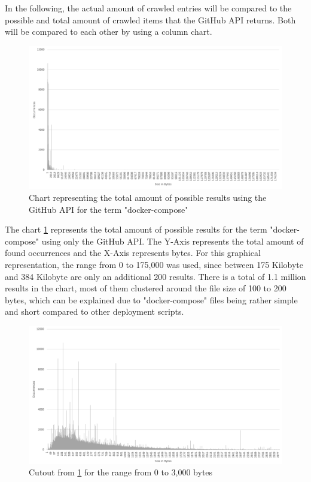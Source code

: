 In the following, the actual amount of crawled entries will be compared to the possible and total amount of crawled items that the GitHub API returns. Both will be compared to each other by using a column chart.

\begin{figure}[H]
    \centering
    \includegraphics[scale=0.5]{graphics/stats_total_bw.png}
    \caption{Chart representing the total amount of possible results using the GitHub API for the term "docker-compose"}
    \label{fig:stats_total}
\end{figure}

The chart \ref{fig:stats_total} represents the total amount of possible results for the term "docker-compose" using only the GitHub API. The Y-Axis represents the total amount of found occurrences and the X-Axis represents bytes. For this graphical representation, the range from 0 to 175,000 was used, since between 175 Kilobyte and 384 Kilobyte are only an additional 200 results. There is a total of 1.1 million results in the chart, most of them clustered around the file size of 100 to 200 bytes, which can be explained due to "docker-compose" files being rather simple and short compared to other deployment scripts. 

\begin{figure}[H]
    \centering
    \includegraphics[scale=0.5]{graphics/stats_range_bw.png}
    \caption{Cutout from \ref{fig:stats_total} for the range from 0 to 3,000 bytes }
    \label{fig:stats_range}
\end{figure}

